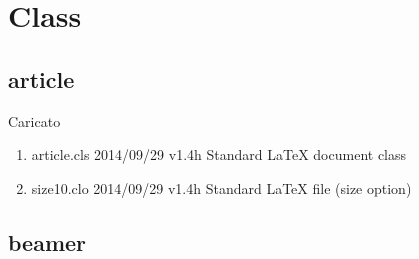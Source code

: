 \chapter{Class}
\section{article}

Caricato
\begin{enumerate}
\item 	article.cls 2014/09/29 v1.4h Standard LaTeX document class
\item size10.clo 2014/09/29 v1.4h Standard LaTeX file (size option)
\end{enumerate}
\section{beamer}

